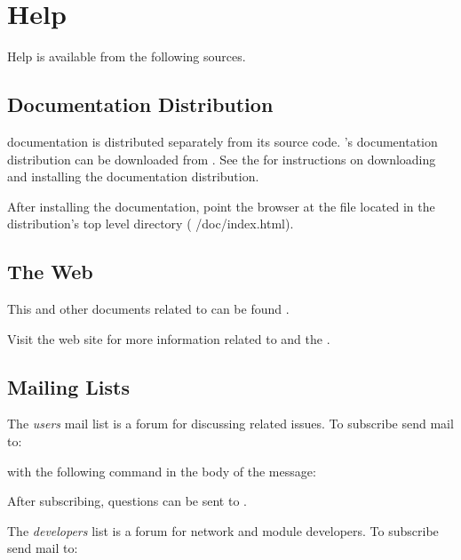 \section{Help}
\label{sec:help}

Help is available from the following sources.

\subsection{Documentation Distribution}

\sr{} documentation is distributed separately from its source code.
\sr{}'s documentation distribution can be downloaded from
.  See the 
for instructions on downloading and installing the documentation
distribution.

After installing the documentation, point the browser at the
 file located in the distribution's top level
 directory (\ie{} /doc/index.html).

\subsection{The Web}

This and other documents related to \sr{} can be found 
.

Visit the \sci{} web site for more
information related to \sr{} and the \scii{}.

\subsection{Mailing Lists}

The \sr{} \emph{users} mail list is a forum for discussing \sr{}
related issues.  To subscribe send mail to:


with the following command in the body of the message:


After subscribing,  questions can be sent to
.

The \sr{} \emph{developers} list is a forum for network and module
developers.  To subscribe send mail to:

